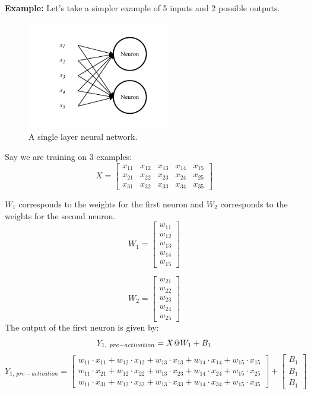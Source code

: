 \documentclass[12pt,a4paper]{article}
\begin{document}
\textbf{Example:} Let's take a simpler example of 5 inputs and 2 possible outputs.
\begin{figure}[ht]
    \centering
    \includegraphics[width=0.55\textwidth]{../figs/Single layer DNN.drawio.pdf}
    \caption{A single layer neural network.}
    \label{fig:single_layer_dnn}
\end{figure}

Say we are training on 3 examples:
\[
X = \begin{bmatrix}
    x_{11} & x_{12} & x_{13} & x_{14} & x_{15} \\
    x_{21} & x_{22} & x_{23} & x_{24} & x_{25} \\
    x_{31} & x_{32} & x_{33} & x_{34} & x_{35}
\end{bmatrix}
\]

$W_1$ corresponds to the weights for the first neuron and $W_2$ corresponds to the weights for the second neuron. 
\[
W_1 = \begin{bmatrix}
    w_{11} \\ w_{12} \\ w_{13} \\ w_{14} \\ w_{15}
\end{bmatrix}
\]

\[
W_2 = \begin{bmatrix}
    w_{21} \\ w_{22} \\ w_{23} \\ w_{24} \\ w_{25}
\end{bmatrix}
\]
The output of the first neuron is given by:
\[
    Y_{1,\ pre-activation} =  X @ W_1 + B_1 \\
\]
\[
    Y_{1,\ pre-activation} = \begin{bmatrix}
        w_{11} \cdot x_{11} + w_{12} \cdot x_{12} + w_{13} \cdot x_{13} + w_{14} \cdot x_{14} + w_{15} \cdot x_{15} \\
        w_{11} \cdot x_{21} + w_{12} \cdot x_{22} + w_{13} \cdot x_{23} + w_{14} \cdot x_{24} + w_{15} \cdot x_{25} \\
        w_{11} \cdot x_{31} + w_{12} \cdot x_{32} + w_{13} \cdot x_{33} + w_{14} \cdot x_{34} + w_{15} \cdot x_{35}
    \end{bmatrix}
    + \begin{bmatrix}
        B_1 \\ 
        B_1 \\
        B_1
    \end{bmatrix}
\]
\end{document}
